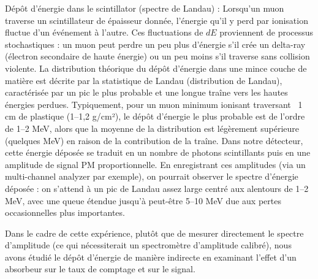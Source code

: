 \documentclass[a4paper,12pt,twoside]{article}
\begin{document}
Dépôt d’énergie dans le scintillator (spectre de Landau) : Lorsqu’un muon traverse un scintillateur de épaisseur donnée, l’énergie qu’il y perd par ionisation fluctue d’un événement à l’autre. Ces fluctuations de $dE$ proviennent de processus stochastiques : un muon peut perdre un peu plus d’énergie s’il crée un delta-ray (électron secondaire de haute énergie) ou un peu moins s’il traverse sans collision violente. La distribution théorique du dépôt d’énergie dans une mince couche de matière est décrite par la statistique de Landau (distribution de Landau), caractérisée par un pic le plus probable et une longue traîne vers les hautes énergies perdues. Typiquement, pour un muon minimum ionisant traversant ~1 cm de plastique (1–1,2 g/cm²), le dépôt d’énergie le plus probable est de l’ordre de 1–2 MeV, alors que la moyenne de la distribution est légèrement supérieure (quelques MeV) en raison de la contribution de la traîne. Dans notre détecteur, cette énergie déposée se traduit en un nombre de photons scintillants puis en une amplitude de signal PM proportionnelle. En enregistrant ces amplitudes (via un multi-channel analyzer par exemple), on pourrait observer le spectre d’énergie déposée : on s’attend à un pic de Landau assez large centré aux alentours de 1–2 MeV, avec une queue étendue jusqu’à peut-être 5–10 MeV due aux pertes occasionnelles plus importantes.

Dans le cadre de cette expérience, plutôt que de mesurer directement le spectre d’amplitude (ce qui nécessiterait un spectromètre d’amplitude calibré), nous avons étudié le dépôt d’énergie de manière indirecte en examinant l’effet d’un absorbeur sur le taux de comptage et sur le signal.
\end{document}
